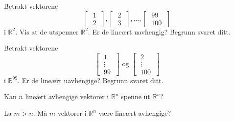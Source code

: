 \begin{oppgave}
\begin{punkt}
Betrakt vektorene
\[ 
\begin{bmatrix} \;1\; \\ \;2\; \end{bmatrix}, 
\begin{bmatrix} \;2\; \\ \;3\; \end{bmatrix}, \dots, 
\begin{bmatrix} \;99\; \\ \;100\; \end{bmatrix}
\]
i $\mathbb{R}^2$. Vis at de utspenner $\mathbb{R}^2$. Er de lineært uavhengig? Begrunn svaret ditt.
\end{punkt}

\begin{punkt}
Betrakt vektorene
\[ 
\begin{bmatrix} 
\;1\; \\ 
\;\vdots\; \\ 
\;99\; 
\end{bmatrix}
\text{ og }
\begin{bmatrix} 
\;2\; \\ 
\;\vdots\; \\ 
\;100\; 
\end{bmatrix}
\]
i $\mathbb{R}^{99}$. Er de lineært uavhengige? Begrunn svaret ditt.

\end{punkt}
\end{oppgave}

\begin{oppgave}
	Kan $n$ lineært avhengige vektorer i $\mathbb{R}^n$ spenne ut $\mathbb{R}^n$? 
\end{oppgave}

\begin{oppgave}
	La $m>n$. Må $m$ vektorer i $\mathbb{R}^n$ være lineært avhengige? 
\end{oppgave}

